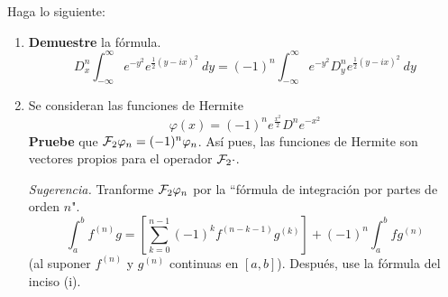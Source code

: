 \documentclass[12pt]{report}
\theoremstyle{largebreak}
\newcommand{\fou}[1]{\ensuremath{\mathcal{F}#1}}
\begin{document}
    \begin{excer}
        Haga lo siguiente:
        \begin{enumerate}
            \item \textbf{Demuestre} la fórmula.
            \begin{equation*}
                D_x^n\int_{-\infty}^\infty e^{ -y^2}e^{\frac{1}{2}(y-ix)^2}\:dy=(-1)^n\int_{-\infty}^\infty e^{ -y^2}D_y^n e^{\frac{1}{2}(y-ix)^2}\:dy
            \end{equation*}
            \item Se consideran las funciones de Hermite
            \begin{equation*}
                \varphi(x)=(-1)^n e^{\frac{x^2}{2}}D^n e^{ -x^2}
            \end{equation*}
            \textbf{Pruebe} que $\fou_2{\varphi_n}=(-1)^n\varphi_n$. Así pues, las funciones de Hermite son vectores propios para el operador $\fou_2{\cdot}$.

            \textit{Sugerencia.} Tranforme $\fou_2{\varphi_n}$ por la ``fórmula de integración por partes de orden $n$".
            \begin{equation*}
                \int_a^b f^{(n)}g=\left[\sum_{ k=0}^{ n-1}(-1)^kf^{ (n-k-1)}g^{(k)} \right]+(-1)^n\int_a^b fg^{(n)}
            \end{equation*}
            (al suponer $f^{(n)}$ y $g^{(n)}$ continuas en $[a,b]$). Después, use la fórmula del inciso (i).
        \end{enumerate}
    \end{excer}
\end{document}
